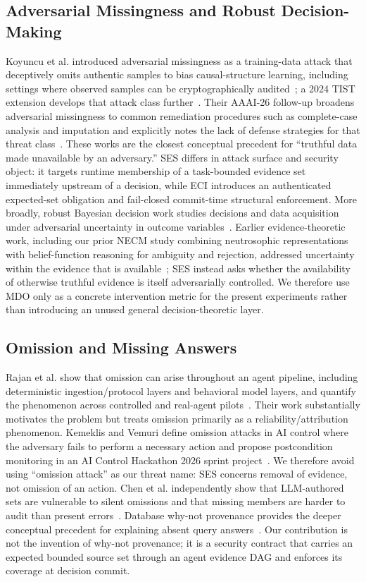 \documentclass[journal,compsoc]{IEEEtran}
\begin{document}
\subsection{Adversarial Missingness and Robust Decision-Making}
Koyuncu et al. introduced adversarial missingness as a training-data attack that deceptively omits authentic samples to bias causal-structure learning, including settings where observed samples can be cryptographically audited~\cite{koyuncu2023missingness}; a 2024 TIST extension develops that attack class further~\cite{koyuncu2024tist}. Their AAAI-26 follow-up broadens adversarial missingness to common remediation procedures such as complete-case analysis and imputation and explicitly notes the lack of defense strategies for that threat class~\cite{koyuncu2026remediation}. These works are the closest conceptual precedent for ``truthful data made unavailable by an adversary.'' SES differs in attack surface and security object: it targets runtime membership of a task-bounded evidence set immediately upstream of a decision, while ECI introduces an authenticated expected-set obligation and fail-closed commit-time structural enforcement. More broadly, robust Bayesian decision work studies decisions and data acquisition under adversarial uncertainty in outcome variables~\cite{harikumar2026robust}. Earlier evidence-theoretic work, including our prior NECM study combining neutrosophic representations with belief-function reasoning for ambiguity and rejection, addressed uncertainty within the evidence that is available~\cite{guo2015necm}; SES instead asks whether the availability of otherwise truthful evidence is itself adversarially controlled. We therefore use MDO only as a concrete intervention metric for the present experiments rather than introducing an unused general decision-theoretic layer.

\subsection{Omission and Missing Answers}
Rajan et al. show that omission can arise throughout an agent pipeline, including deterministic ingestion/protocol layers and behavioral model layers, and quantify the phenomenon across controlled and real-agent pilots~\cite{rajan2026missing}. Their work substantially motivates the problem but treats omission primarily as a reliability/attribution phenomenon. Kemeklis and Vemuri define omission attacks in AI control where the adversary fails to perform a necessary action and propose postcondition monitoring in an AI Control Hackathon 2026 sprint project~\cite{kemeklis2026omission}. We therefore avoid using ``omission attack'' as our threat name: SES concerns removal of evidence, not omission of an action. Chen et al. independently show that LLM-authored sets are vulnerable to silent omissions and that missing members are harder to audit than present errors~\cite{chen2026enumerating}. Database why-not provenance provides the deeper conceptual precedent for explaining absent query answers~\cite{lee2017whynot,lee2018pug}. Our contribution is not the invention of why-not provenance; it is a security contract that carries an expected bounded source set through an agent evidence DAG and enforces its coverage at decision commit.
\end{document}
